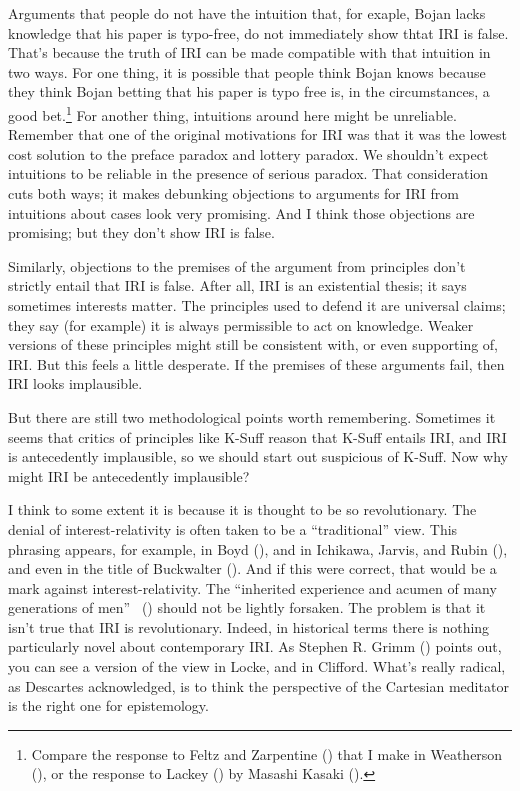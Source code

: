 \documentclass[
  10pt,
  letterpaper,
  DIV=11,
  numbers=noendperiod,
  twoside]{scrartcl}
\begin{document}
Arguments that people do not have the intuition that, for exaple, Bojan
lacks knowledge that his paper is typo-free, do not immediately show
thtat IRI is false. That's because the truth of IRI can be made
compatible with that intuition in two ways. For one thing, it is
possible that people think Bojan knows because they think Bojan betting
that his paper is typo free is, in the circumstances, a good
bet.\footnote{Compare the response to Feltz and Zarpentine
  () that I make in Weatherson
  (), or the response
  to Lackey () by Masashi Kasaki
  ().} For another thing,
intuitions around here might be unreliable. Remember that one of the
original motivations for IRI was that it was the lowest cost solution to
the preface paradox and lottery paradox. We shouldn't expect intuitions
to be reliable in the presence of serious paradox. That consideration
cuts both ways; it makes debunking objections to arguments for IRI from
intuitions about cases look very promising. And I think those objections
are promising; but they don't show IRI is false.

Similarly, objections to the premises of the argument from principles
don't strictly entail that IRI is false. After all, IRI is an
existential thesis; it says sometimes interests matter. The principles
used to defend it are universal claims; they say (for example) it is
always permissible to act on knowledge. Weaker versions of these
principles might still be consistent with, or even supporting of, IRI.
But this feels a little desperate. If the premises of these arguments
fail, then IRI looks implausible.

But there are still two methodological points worth remembering.
Sometimes it seems that critics of principles like K-Suff reason that
K-Suff entails IRI, and IRI is antecedently implausible, so we should
start out suspicious of K-Suff. Now why might IRI be antecedently
implausible?

I think to some extent it is because it is thought to be so
revolutionary. The denial of interest-relativity is often taken to be a
``traditional'' view. This phrasing appears, for example, in Boyd
(), and in Ichikawa, Jarvis, and Rubin
(), and even in the title of
Buckwalter (). And if this were
correct, that would be a mark against interest-relativity. The
``inherited experience and acumen of many generations of men''
~() should not be lightly
forsaken. The problem is that it isn't true that IRI is revolutionary.
Indeed, in historical terms there is nothing particularly novel about
contemporary IRI. As Stephen R. Grimm ()
points out, you can see a version of the view in Locke, and in Clifford.
What's really radical, as Descartes acknowledged, is to think the
perspective of the Cartesian meditator is the right one for
epistemology.
\end{document}
